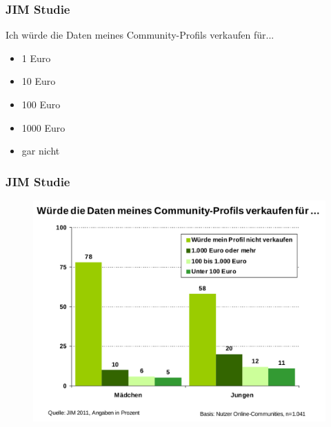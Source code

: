 \documentclass[12pt]{beamer}
\begin{document}
\begin{frame}
  \frametitle{JIM Studie}
  \begin{center} \Large
    Ich würde die Daten meines Community-Profils verkaufen für...
  \end{center}
  \begin{itemize}
    \item<2-> 1 Euro
    \item<3-> 10 Euro
    \item<4-> 100 Euro
    \item<5-> 1000 Euro
    \item<7-> gar nicht
  \end{itemize}
\end{frame}

\begin{frame}
  \frametitle{JIM Studie}
  \begin{figure}
    \includegraphics[height=0.7\textheight]{img/jim_verkaufen.png}
  \end{figure}
\end{frame}
\end{document}
